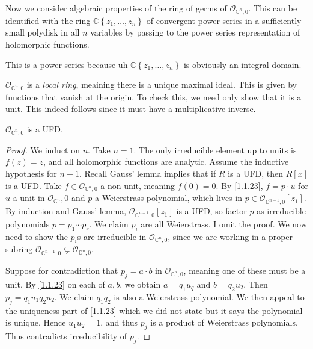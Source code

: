 Now we consider algebraic properties of the ring of germs of $\mathcal{O} _{\mathbb{C} ^n,0} $. This can be identified with the ring $\mathbb{C} \left\{ z_1, \ldots ,z_n \right\} $ of convergent power series in a sufficiently small polydisk in all $n$ variables by passing to the power series representation of holomorphic functions.

\begin{remark}\label{1.1.25}
	This is a power series because uh $\mathbb{C} \left\{ z_1, \ldots ,z_n \right\} $ is obviously an integral domain.
\end{remark}
\begin{remark}\label{1.1.26}
	$\mathcal{O}_{\mathbb{C} ^n,0} $ is a \emph{local ring}, meaining there is a unique maximal ideal. This is given by functions that vanish at the origin. To check this, we need only show that it is a unit. This indeed follows since it must have a multiplicative inverse.
\end{remark}

\begin{proposition}\label{1.1.27}
	$\mathcal{O} _{\mathbb{C} ^n,0} $ is a UFD.
\end{proposition}
\begin{proof}
	We induct on $n$. Take $n=1$. The only irreducible element up to units is $f(z)=z$, and all holomorphic functions are analytic. Assume the inductive hypothesis for $n-1$. Recall Gauss' lemma implies that if $R$ is a UFD, then $R[x]$ is a UFD. Take $f\in \mathcal{O} _{\mathbb{C} ^n,0} $ a non-unit, meaning $f(0)=0$. By \cref{1.1.23}, $f=p\cdot u$ for $u$ a unit in $\mathcal{O} _{\mathbb{C} ^n} ,0$ and $p$ a Weierstrass polynomial, which lives in $p\in \mathcal{O} _{\mathbb{C} ^{n-1} ,0} [z_1]$. By induction and Gauss' lemma, $\mathcal{O} _{\mathbb{C} ^{n-1} ,0} [z_1]$ is a UFD, so factor $p$ as irreducible polynomials $p=p_1 \cdots p_r$. We claim $p_i$ are all Weierstrass. I omit the proof. We now need to show the $p_i$s are irreducible in $\mathcal{O} _{\mathbb{C} ^n,0} $, since we are working in a proper subring $\mathcal{O} _{\mathbb{C} ^{n-1} ,0} \subsetneq \mathcal{O} _{\mathbb{C} ^n,0} $.

	Suppose for contradiction that $p_j=a\cdot b$ in $\mathcal{O} _{\mathbb{C} ^n,0} $, meaning one of these must be a unit. By \cref{1.1.23} on each of $a,b$, we obtain $a=q_1u_q$ and $b=q_2u_2$. Then $p_j=q_1u_1q_2u_2$. We claim $q_1q_2$ is also a Weierstrass polynomial. We then appeal to the uniqueness part of \cref{1.1.23} which we did not state but it says the polynomial is unique. Hence $u_1u_2=1$, and thus $p_j$ is a product of Weierstrass polynomials. Thus contradicts irreducibility of $p_j$.
\end{proof}

